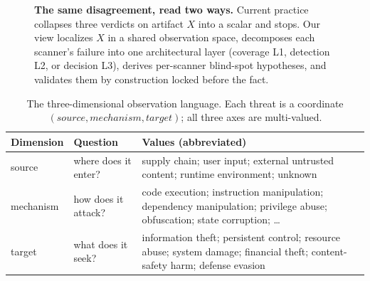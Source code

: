\documentclass[sigconf,nonacm]{acmart}
\begin{document}
\begin{figure}[t]
\caption{\textbf{The same disagreement, read two ways.} Current practice collapses three verdicts on artifact $X$ into a scalar and stops. Our view localizes $X$ in a shared observation space, decomposes each scanner's failure into one architectural layer (coverage L1, detection L2, or decision L3), derives per-scanner blind-spot hypotheses, and validates them by construction locked before the fact.}
\label{fig:pipeline}
\end{figure}

\begin{table}[t]
\caption{The three-dimensional observation language. Each threat is a coordinate $(source, mechanism, target)$; all three axes are multi-valued.}
\label{tab:dims}
\small
\begin{tabular}{@{}p{1.2cm}p{1.9cm}p{4.6cm}@{}}
\toprule
Dimension & Question & Values (abbreviated) \\
\midrule
source & where does it enter? & supply chain; user input; external untrusted content; runtime environment; unknown \\
mechanism & how does it attack? & code execution; instruction manipulation; dependency manipulation; privilege abuse; obfuscation; state corruption; \ldots \\
target & what does it seek? & information theft; persistent control; resource abuse; system damage; financial theft; content-safety harm; defense evasion \\
\bottomrule
\end{tabular}
\end{table}
\end{document}
